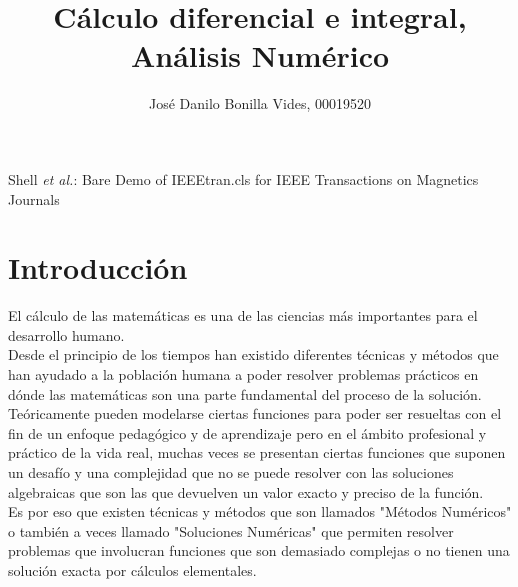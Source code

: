 \documentclass[journal,transmag]{IEEEtran}
\theoremstyle{mytheoremstyle}
\theoremstyle{mytheoremstyle}
\theoremstyle{myproblemstyle}
\begin{document}
\title{Cálculo diferencial e integral, Análisis Numérico}
\author{José Danilo Bonilla Vides, 00019520}
%
{Shell \MakeLowercase{\textit{et al.}}: Bare Demo of IEEEtran.cls for IEEE Transactions on Magnetics Journals}


\maketitle

\IEEEdisplaynontitleabstractindextext

\IEEEpeerreviewmaketitle

\section{Introducción}
El cálculo de las matemáticas es una de las ciencias más importantes para el desarrollo humano. \\
Desde el principio de los tiempos han existido diferentes técnicas y métodos que han ayudado 
a la población humana a poder resolver problemas prácticos en dónde las matemáticas son una parte
fundamental del proceso de la solución. \\

Teóricamente pueden modelarse ciertas funciones para poder ser resueltas con el fin de un enfoque pedagógico y de aprendizaje
pero en el ámbito profesional y práctico de la vida real, muchas veces se presentan ciertas funciones 
que suponen un desafío y una complejidad que no se puede resolver con las soluciones algebraicas que son
las que devuelven un valor exacto y preciso de la función. \\

Es por eso que existen técnicas y métodos que son llamados "Métodos Numéricos" o también a veces llamado "Soluciones Numéricas" 
que permiten resolver problemas que involucran funciones que son demasiado complejas
o no tienen una solución exacta por cálculos elementales. \\
\end{document}
